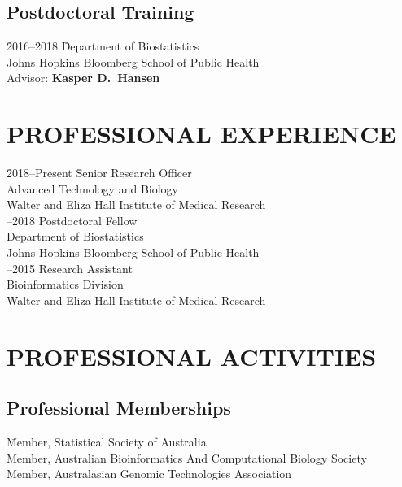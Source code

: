 \documentclass[11pt,letterpaper,pdf]{article}
\begin{document}
\subsection*{Postdoctoral Training}

\begin{tabbing}
  \= 2016--2018 \hspace*{0.55cm} \= Department of Biostatistics \\
  \>\> Johns Hopkins Bloomberg School of Public Health\\
  \>\> Advisor: {\bf Kasper D.\ Hansen}
\end{tabbing}

\section*{PROFESSIONAL EXPERIENCE}

\begin{tabbing}
  \= 2018--Present \hspace*{0.1cm} \= Senior Research Officer\\
  \>\>Advanced Technology and Biology\\
  \>\>Walter and Eliza Hall Institute of Medical Research\\
  --2018 \> Postdoctoral Fellow\\
  \>\>Department of Biostatistics\\
  \>\> Johns Hopkins Bloomberg School of Public Health\\
  --2015 \> Research Assistant\\
  \>\>Bioinformatics Division\\
  \>\> Walter and Eliza Hall Institute of Medical Research
\end{tabbing}

\section*{PROFESSIONAL ACTIVITIES}

\subsection*{Professional Memberships}

\begin{tabbing}
  \= Member, Statistical Society of Australia\\
  \> Member, Australian Bioinformatics And Computational Biology Society\\
  \> Member, Australasian Genomic Technologies Association\\
\end{tabbing}
\end{document}
